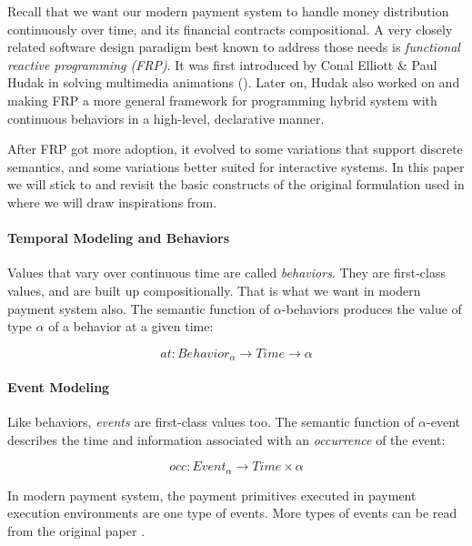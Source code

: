 Recall that we want our modern payment system to handle money distribution continuously over time,
and its financial contracts compositional. A very closely related software design paradigm best
known to address those needs is \textit{functional reactive programming (FRP)}.  It was first
introduced by Conal Elliott \& Paul Hudak in solving multimedia animations
(\cite{elliott1997functional}). Later on, Hudak also worked on \cite{hudak2002arrows} and
\cite{wan2000functional} making FRP a more general framework for programming hybrid system with
continuous behaviors in a high-level, declarative manner.

After FRP got more adoption, it evolved to some variations that support discrete semantics, and some
variations better suited for interactive systems. In this paper we will stick to and revisit the
basic constructs of the original formulation used in \cite{elliott1997functional} where we will draw
inspirations from.

\paragraph{Temporal Modeling and Behaviors}

Values that vary over continuous time are called \textit{behaviors}. They are first-class values,
and are built up compositionally. That is what we want in modern payment system also. The semantic
function of $\alpha$-behaviors produces the value of type $\alpha$ of a behavior at a given time:

\begin{equation}
    at : Behavior_{\alpha} \rightarrow Time \rightarrow \alpha
\end{equation}

\paragraph{Event Modeling}

Like behaviors, \textit{events} are first-class values too. The semantic function of $\alpha$-event
describes the time and information associated with an \textit{occurrence} of the event:

\begin{equation}
    occ : Event_{\alpha} \rightarrow Time \times \alpha
\end{equation}

In modern payment system, the payment primitives executed in payment execution environments are
one type of events. More types of events can be read from the original paper .

